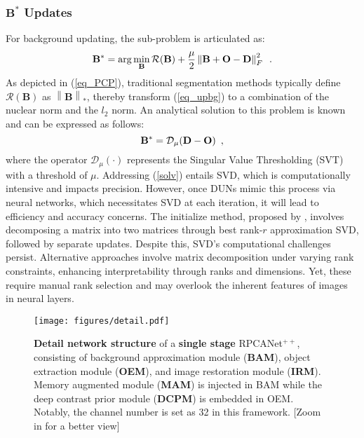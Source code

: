 \documentclass[10pt,journal,compsoc]{IEEEtran}
\begin{document}
\subsubsection{$\mathbf{B}^*$ Updates} For background updating, the sub-problem is articulated as:
\begin{equation}
\setlength{\abovedisplayskip}{3pt}
\setlength{\belowdisplayskip}{4pt}
    \mathbf{B}^* = \arg \min \limits_{\mathbf{B}} \mathcal{R}(\mathbf{B}) + \frac{\mu}{2} \left\| \mathbf{B} + \mathbf{O} - \mathbf{D}\right\|^2_F \enspace.
\label{eq_upbg}
\vspace{-0.2cm}
\end{equation}
As depicted in (\ref{eq_PCP}), traditional segmentation methods typically define $\mathcal{R}(\mathbf{B})$ as ${\left\| \mathbf{B} \right\|_*}$, thereby transform (\ref{eq_upbg}) to a combination of the nuclear norm and the $l_2$ norm. An analytical solution to this problem is known and can be expressed as follows:
\begin{equation}
\setlength{\abovedisplayskip}{2pt}
\setlength{\belowdisplayskip}{3pt}
    \mathbf{B}^* = \mathcal{\mathcal{D}}_{\mu}(\mathbf{D}-\mathbf{O}) \enspace,
    \vspace{-0.15cm}
\label{solv}
\end{equation}
where the operator $ \mathcal{D}_{\mu}(\cdot)$  represents the Singular Value Thresholding (SVT) \cite{ma-2011-fixed} with a threshold of $\mu$. Addressing (\ref{solv}) entails SVD, which is computationally intensive and impacts precision. However, once DUNs mimic this process via neural networks, which necessitates SVD at each iteration, it will lead to efficiency and accuracy concerns. The initialize method, proposed by \cite{cai-2021-lrpca}, involves decomposing a matrix into two matrices through best rank-$r$ approximation SVD, followed by separate updates. Despite this, SVD's computational challenges persist. Alternative approaches \cite{zhang-2022-lrcsnet} involve matrix decomposition under varying rank constraints, enhancing interpretability through ranks and dimensions. Yet, these require manual rank selection and may overlook the inherent features of images in neural layers.
\begin{figure*}[!ht]
\setlength{\abovecaptionskip}{1pt}
\setlength{\belowcaptionskip}{0pt}
\centering
	\texttt{[image: figures/detail.pdf]}
   \caption{\textbf{Detail network structure} of a \textbf{single stage} RPCANet$^{++}$, consisting of background approximation module (\textbf{BAM}), object extraction module (\textbf{OEM}), and image restoration module (\textbf{IRM}). Memory augmented module (\textbf{MAM}) is injected in BAM while the deep contrast prior module (\textbf{DCPM}) is embedded in OEM. Notably, the channel number is set as 32 in this framework. [Zoom in for a better view]}
\label{fig:detail}
\vspace{-0.5cm}
\end{figure*}
\end{document}
